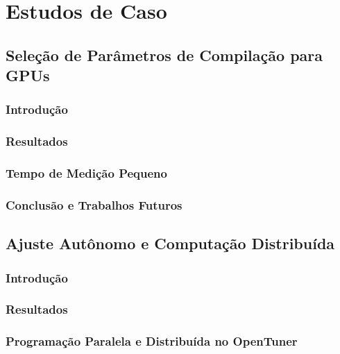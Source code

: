 \chapter{Estudos de Caso}
\label{chap:usecases}

\section{Seleção de Parâmetros de Compilação para GPUs}
\label{sec:paramSelGPU}

\subsection{Introdução}
\label{subsec:GPUintro}

\subsection{Resultados}
\label{subsec:GPUres}

\subsection{Tempo de Medição Pequeno}
\label{subsec:smalltime}

\subsection{Conclusão e Trabalhos Futuros}
\label{subsec:GPUconcl}

\section{Ajuste Autônomo e Computação Distribuída}
\label{sec:autotuningCloud}

\subsection{Introdução}
\label{subsec:CLintro}

\subsection{Resultados}
\label{subsec:CLres}

\subsection{Programação Paralela e Distribuída no OpenTuner}
\label{subsec:parallel}

